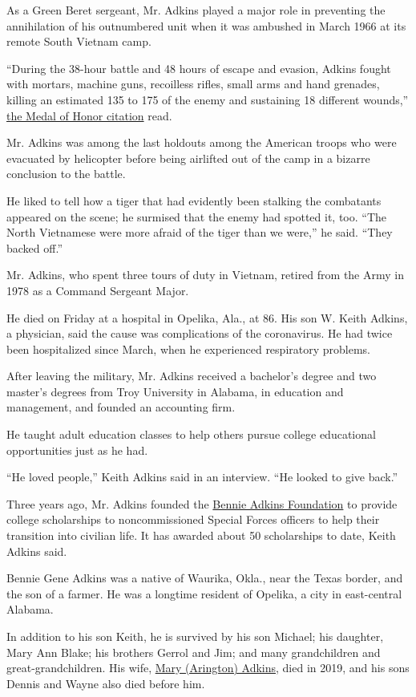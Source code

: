 As a Green Beret sergeant, Mr. Adkins played a major role in preventing
the annihilation of his outnumbered unit when it was ambushed in March
1966 at its remote South Vietnam camp.

``During the 38-hour battle and 48 hours of escape and evasion, Adkins
fought with mortars, machine guns, recoilless rifles, small arms and
hand grenades, killing an estimated 135 to 175 of the enemy and
sustaining 18 different wounds,''
\href{https://www.army.mil/medalofhonor/adkins/}{the Medal of Honor
citation} read.

Mr. Adkins was among the last holdouts among the American troops who
were evacuated by helicopter before being airlifted out of the camp in a
bizarre conclusion to the battle.

He liked to tell how a tiger that had evidently been stalking the
combatants appeared on the scene; he surmised that the enemy had spotted
it, too. ``The North Vietnamese were more afraid of the tiger than we
were,'' he said. ``They backed off.''

Mr. Adkins, who spent three tours of duty in Vietnam, retired from the
Army in 1978 as a Command Sergeant Major.

He died on Friday at a hospital in Opelika, Ala., at 86. His son W.
Keith Adkins, a physician, said the cause was complications of the
coronavirus. He had twice been hospitalized since March, when he
experienced respiratory problems.

After leaving the military, Mr. Adkins received a bachelor's degree and
two master's degrees from Troy University in Alabama, in education and
management, and founded an accounting firm.

He taught adult education classes to help others pursue college
educational opportunities just as he had.

``He loved people,'' Keith Adkins said in an interview. ``He looked to
give back.''

Three years ago, Mr. Adkins founded the
\href{https://www.bennieadkinsfoundation.org/}{Bennie Adkins Foundation}
to provide college scholarships to noncommissioned Special Forces
officers to help their transition into civilian life. It has awarded
about 50 scholarships to date, Keith Adkins said.

Bennie Gene Adkins was a native of Waurika, Okla., near the Texas
border, and the son of a farmer. He was a longtime resident of Opelika,
a city in east-central Alabama.

In addition to his son Keith, he is survived by his son Michael; his
daughter, Mary Ann Blake; his brothers Gerrol and Jim; and many
grandchildren and great-grandchildren. His wife,
\href{https://www.jeffcoattrant.com/notices/MaryN-Adkins}{Mary
(Arington) Adkins}, died in 2019, and his sons Dennis and Wayne also
died before him.

